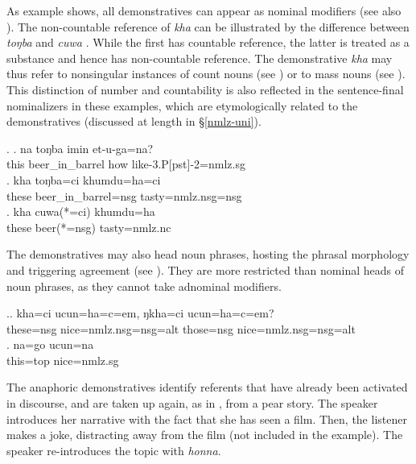 As example \Last shows, all demonstratives can appear as nominal modifiers (see also \Next). The non-countable reference of \emph{kha} can be illustrated by the difference between \emph{toŋba}  and \emph{cuwa} . While the first has countable reference, the latter is treated as a substance and hence has non-countable reference. The demonstrative \emph{kha} may thus refer to nonsingular instances of count nouns (see \Next[b]) or to mass nouns  (see \Next[c]). This distinction of number and countability is also reflected in the sentence-final nominalizers in these examples, which are etymologically related to the demonstratives (discussed at length in §\ref{nmlz-uni}).

\ex. \ag. 	na toŋba imin et-u-ga=na?\\
			this beer\_in\_barrel how like{\sc -3.P[pst]-2=nmlz.sg}\\
			\bg.	kha toŋba=ci khumdu=ha=ci\\
			these beer\_in\_barrel{\sc =nsg} tasty{\sc =nmlz.nsg=nsg}\\
			\bg.	kha cuwa(*=ci) khumdu=ha\\
			these beer{\sc (*=nsg)} tasty{\sc =nmlz.nc}\\
				
The demonstratives may also head noun phrases, hosting the phrasal morphology and triggering agreement (see \Next). They are more restricted than nominal heads of noun phrases, as they cannot take adnominal modifiers.  
			
	\ex.\ag.	kha=ci ucun=ha=c=em, ŋkha=ci ucun=ha=c=em?\\
			these{\sc =nsg} nice{\sc =nmlz.nsg=nsg=alt} those{\sc =nsg} nice{\sc =nmlz.nsg=nsg=alt}\\ 
	\bg. 	na=go ucun=na\\
			this{\sc =top} nice{\sc =nmlz.sg}\\

			
The anaphoric demonstratives identify referents that have already been activated in discourse, and are taken up again, as in \Next, from a pear story. The speaker introduces her narrative with the fact that she has seen a film. Then, the listener makes a joke, distracting away from the film (not included in the example).  The speaker re-introduces the topic with \emph{honna}.


